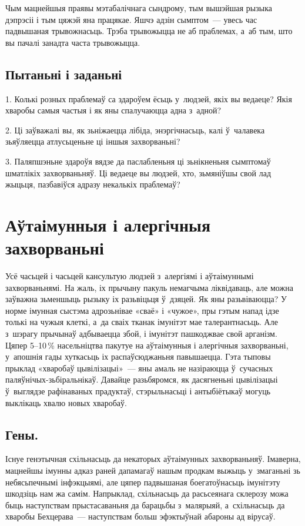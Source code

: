 Чым мацнейшыя праявы мэтабалічнага сындрому, тым вышэйшая рызыка дэпрэсіі і тым цяжэй яна працякае. Яшчэ адзін сымптом~--- увесь час падвышаная трывожнасьць. Трэба трывожыцца не аб праблемах, а~аб тым, што вы пачалі занадта часта трывожыцца.

\subsection*{Пытаньні і заданьні}

1. Колькі розных праблемаў са здароўем ёсьць у~людзей, якіх вы ведаеце? Якія хваробы самыя частыя і як яны спалучаюцца адна з~адной?

2. Ці заўважалі вы, як зьніжаецца лібіда, энэргічнасьць, калі ў~чалавека зьяўляецца атлусьценьне ці іншыя захворваньні?

3. Паляпшэньне здароўя вядзе да паслабленьня ці зьнікненьня сымптомаў шматлікіх захворваньняў. Ці ведаеце вы людзей, хто, зьмяніўшы свой лад жыцьця, пазбавіўся адразу некалькіх праблемаў?


\section{Аўтаімунныя і алергічныя захворваньні}

Усё часьцей і часьцей кансультую людзей з~алергіямі і аўтаімуннымі захворваньнямі. На жаль, іх прычыну пакуль немагчыма ліквідаваць, але можна заўважна зьменшыць рызыку іх разьвіцьця ў~дзяцей. Як яны разьвіваюцца? У норме імунная сыстэма адрозьнівае «сваё» і «чужое», пры гэтым напад ідзе толькі на чужыя клеткі, а~да сваіх тканак імунітэт мае талерантнасьць. Але з~шэрагу прычынаў адбываецца збой, і імунітэт пашкоджвае свой арганізм. Цяпер 5--10\,\% насельніцтва пакутуе на аўтаімунныя і алергічныя захворваньні, у~апошнія гады хуткасьць іх распаўсюджаньня павышаецца. Гэта тыповы прыклад «хваробаў цывілізацыі»~--- яны амаль не назіраюцца ў~сучасных паляўнічых-зьбіральнікаў. Давайце разьбяромся, як дасягненьні цывілізацыі ў~выглядзе рафінаваных прадуктаў, стэрыльнасьці і антыбіётыкаў могуць выклікаць хвалю новых хваробаў.

\subsection*{Гены.}

Існуе генэтычная схільнасьць да некаторых аўтаімунных захворваньняў. Імаверна, мацнейшы імунны адказ раней дапамагаў нашым продкам выжыць у~змаганьні зь небясьпечнымі інфэкцыямі, але цяпер падвышаная боегатоўнасьць імунітэту шкодзіць нам жа самім. Напрыклад, схільнасьць да расьсеянага склерозу можа быць наступствам прыстасаваньня да барацьбы з~малярыяй, а~схільнасьць да хваробы Бехцерава~--- наступствам больш эфэктыўнай абароны ад вірусаў.

